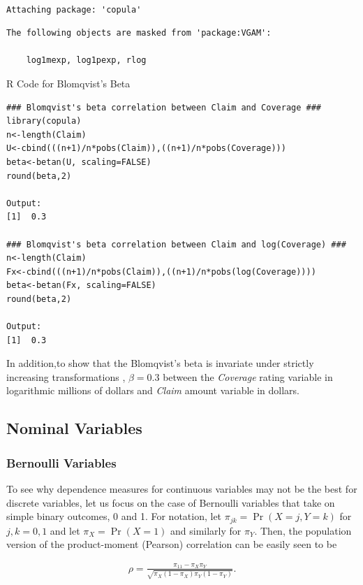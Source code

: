 \documentclass[]{book}
\theoremstyle{definition}
\theoremstyle{definition}
\theoremstyle{definition}
\theoremstyle{remark}
\begin{document}
\begin{verbatim}

Attaching package: 'copula'
\end{verbatim}

\begin{verbatim}
The following objects are masked from 'package:VGAM':

    log1mexp, log1pexp, rlog
\end{verbatim}

R Code for Blomqvist's Beta

\hypertarget{display.beta.2}{}
\begin{verbatim}
### Blomqvist's beta correlation between Claim and Coverage ###
library(copula)
n<-length(Claim)
U<-cbind(((n+1)/n*pobs(Claim)),((n+1)/n*pobs(Coverage)))
beta<-betan(U, scaling=FALSE)
round(beta,2)

Output:
[1]  0.3

### Blomqvist's beta correlation between Claim and log(Coverage) ###
n<-length(Claim)
Fx<-cbind(((n+1)/n*pobs(Claim)),((n+1)/n*pobs(log(Coverage))))
beta<-betan(Fx, scaling=FALSE)
round(beta,2)

Output:
[1]  0.3
\end{verbatim}

In addition,to show that the Blomqvist's beta is invariate under
strictly increasing transformations , \(\beta=0.3\) between the
\emph{Coverage} rating variable in logarithmic millions of dollars and
\emph{Claim} amount variable in dollars.

\subsection{Nominal Variables}\label{nominal-variables}

\subsubsection{Bernoulli Variables}\label{bernoulli-variables}

To see why dependence measures for continuous variables may not be the
best for discrete variables, let us focus on the case of Bernoulli
variables that take on simple binary outcomes, 0 and 1. For notation,
let \(\pi_{jk} = \Pr(X=j, Y=k)\) for \(j,k=0,1\) and let
\(\pi_X=\Pr(X=1)\) and similarly for \(\pi_Y\). Then, the population
version of the product-moment (Pearson) correlation can be easily seen
to be

\begin{eqnarray*}
\rho = \frac{\pi_{11} - \pi_X \pi_Y}{\sqrt{\pi_X(1-\pi_X)\pi_Y(1-\pi_Y)}} .
\end{eqnarray*}
\end{document}
